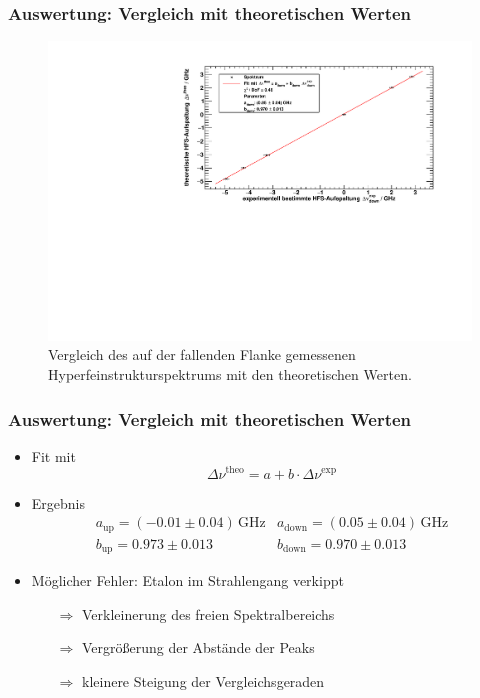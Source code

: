 \begin{frame}
\frametitle{Auswertung: Vergleich mit theoretischen Werten}
\begin{figure}
\begin{center}
    \includegraphics[width=\textwidth]{../img/down-spectrum.pdf}
    \caption{Vergleich des auf der fallenden Flanke gemessenen Hyperfeinstrukturspektrums mit den theoretischen Werten.}
\end{center}
\end{figure}
\end{frame}


\begin{frame}
\frametitle{Auswertung: Vergleich mit theoretischen Werten}
\begin{itemize}[<+->]
    \item Fit mit
    \begin{equation*}
        \Delta \nu^\text{theo} = a + b \cdot \Delta \nu^\text{exp}
    \end{equation*}
    \item Ergebnis
    \begin{equation*}
        \begin{array}{ll}
            a_\text{up} = (-0.01 \pm 0.04)\,\text{GHz} & a_\text{down} = (0.05 \pm 0.04)\,\text{GHz} \\
            b_\text{up} = 0.973 \pm 0.013 & b_\text{down} = 0.970 \pm 0.013
        \end{array}
    \end{equation*}
    \item Möglicher Fehler: Etalon im Strahlengang verkippt
    \begin{itemize}[<+->]
        \item[$\Rightarrow$] Verkleinerung des freien Spektralbereichs
        \item[$\Rightarrow$] Vergrößerung der Abstände der Peaks
        \item[$\Rightarrow$] kleinere Steigung der Vergleichsgeraden
    \end{itemize}
\end{itemize}
\end{frame}



